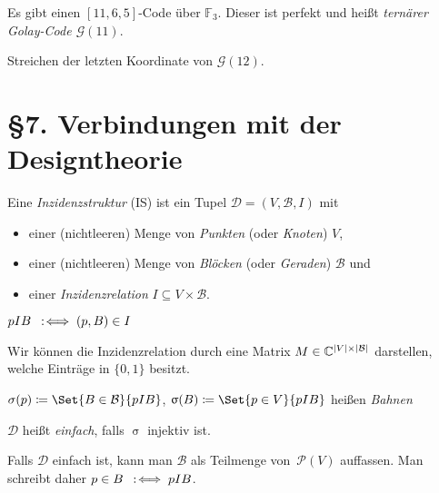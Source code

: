 \documentclass{cheat-sheet}
\newcommand{\F}{\mathbb{F}} %
\newcommand{\Golay}{\mathcal{G}} %
\newcommand{\Design}{\mathcal{D}} %
\newcommand{\Blocks}{\mathcal{B}} %
\newcommand{\Pow}{\mathcal{P}} %
\begin{document}

\begin{satz}
  Es gibt einen $[11, 6, 5]$-Code über $\F_3$. Dieser ist perfekt und heißt \emph{ternärer Golay-Code $\Golay(11)$}.
\end{satz}

\begin{konstr}
  Streichen der letzten Koordinate von $\Golay(12)$.
\end{konstr}

\section{§7. Verbindungen mit der Designtheorie}

\begin{defn}
  Eine \emph{Inzidenzstruktur} (IS) ist ein Tupel $\Design = (V, \Blocks, I)$ mit
  \begin{itemize}
    \item einer (nichtleeren) Menge von \emph{Punkten} (oder \textit{Knoten}) $V$,
    \item einer (nichtleeren) Menge von \emph{Blöcken} (oder \textit{Geraden}) $\Blocks$ und
    \item einer \emph{Inzidenzrelation} $I \subseteq V \times \Blocks$.
  \end{itemize}
\end{defn}

\begin{nota}
  $p I B \enspace:\!\iff (p, B) \in I$
\end{nota}

\begin{bem}
  Wir können die Inzidenzrelation durch eine Matrix $M \in \C^{\abs{V} \times \abs{\Blocks}}$ darstellen, welche Einträge in $\{ 0, 1 \}$ besitzt.
\end{bem}

\begin{defn}
  $\sigma(p) \coloneqq \Set{B \in \Blocks}{p I B}$,
  $\upsigma(B) \coloneqq \Set{p \in V}{p I B}$ \enspace
  heißen \emph{Bahnen}
\end{defn}

\begin{defn}
  $\Design$ heißt \emph{einfach}, falls $\upsigma$ injektiv ist.
\end{defn}

\begin{nota}
  Falls $\Design$ einfach ist, kann man $\Blocks$ als Teilmenge von~$\Pow(V)$ auffassen. Man schreibt daher
  $p \in B \enspace:\!\iff p I B$.
\end{nota}
\end{document}
